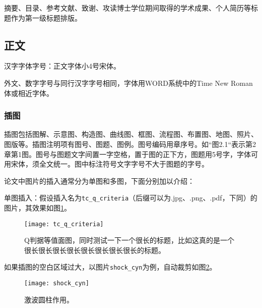 摘要、目录、参考文献、致谢、攻读博士学位期间取得的学术成果、个人简历等标题作为第一级标题排版。

\subsection{正文}
汉字字体字号：正文字体小4号宋体。

外文、数字字号与同行汉字字号相同，字体用WORD系统中的Time New Roman体或相近字体。

\subsubsection{插图}
插图包括图解、示意图、构造图、曲线图、框图、流程图、布置图、地图、照片、图版等。插图注明项有图号、图题、图例。图号编码用章序号。如“图2.1“表示第2章第1图。图号与图题文字间置一字空格，置于图的正下方，图题用5号字，字体可用宋体，须全文统一。图中标注符号文字字号不大于图题的字号。

论文中图片的插入通常分为单图和多图，下面分别加以介绍：

单图插入：假设插入名为\verb|tc_q_criteria|（后缀可以为.jpg、.png、.pdf，下同）的图片，其效果如图\ref{fig:tc_q_criteria}。
\begin{figure}[!htbp]
    \centering
    \texttt{[image: tc\_q\_criteria]}
    \caption{Q判据等值面图，同时测试一下一个很长的标题，比如这真的是一个很长很长很长很长很长很长很长很长的标题。}%
    \label{fig:tc_q_criteria}
\end{figure}

如果插图的空白区域过大，以图片\verb|shock_cyn|为例，自动裁剪如图\ref{fig:shock_cyn}。
\begin{figure}[!htbp]
    \centering
    \texttt{[image: shock\_cyn]}
    \caption{激波圆柱作用。}%
    \label{fig:shock_cyn}
\end{figure}

